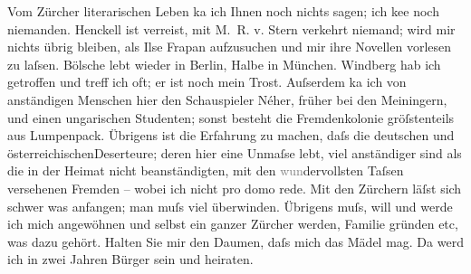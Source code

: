 \pstart
           Vom Zürcher literarischen Leben ka{\geminationn} ich Ihnen noch nichts sagen; ich ke{\geminationn}e noch niemanden. Henckell ist verreist, mit M. R. v.
                  Stern verkehrt niemand; wird mir nichts übrig bleiben, als Ilse Frapan aufzusuchen und mir ihre Novellen
               vorlesen zu laſsen. Bölsche lebt wieder in Berlin, Halbe in München. Windberg hab ich getroffen und treff ich oft; er ist noch mein
               Trost. Auſserdem ka{\geminationn} ich von anständigen Menschen hier
               den Schauspieler Néher, früher bei den Meiningern, und einen ungarischen Studenten; sonst besteht die Fremdenkolonie gröſstenteils aus Lumpenpack.
               Übrigens ist die Erfahrung zu machen, daſs die deutschen und österreichischenDeserteure; deren hier eine Unmaſse lebt, viel
               anständiger sind als die in der Heimat nicht beanständigten, mit den
                  \textcolor{gray}{wun}dervollsten Taſsen versehenen Fremden – wobei ich nicht pro
               domo rede. Mit den Zürchern läſst sich schwer was
               anfangen; man muſs viel überwinden. Übrigens muſs, will und werde ich mich angewöhnen
               und selbst ein ganzer Zürcher werden, Familie
               gründen etc, was dazu gehört. Halten Sie mir den Daumen, daſs mich das Mädel mag.
                  Da{\geminationn} werd ich in zwei Jahren Bürger \introOben{}sein\introOben{} und heiraten.\pend
           
